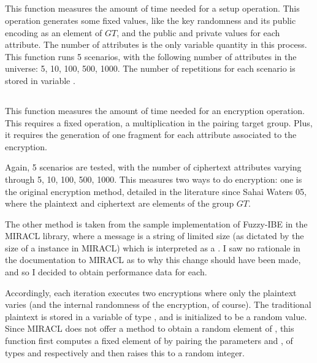 \documentclass{article}
\begin{document}
\subsection{}

This function measures the amount of time needed for a setup operation. This operation generates some fixed values, like the key randomness and its public encoding as an element of $GT$, and the public and private values for each attribute. The number of attributes is the only variable quantity in this process. This function runs 5 scenarios, with the following number of attributes in the universe: 5, 10, 100, 500, 1000.
The number of repetitions for each scenario is stored in variable .

\subsection{}

This function measures the amount of time needed for an encryption operation. This requires a fixed operation, a multiplication in the pairing target group. Plus, it requires the generation of one fragment for each attribute associated to the encryption. 

Again, 5 scenarios are tested, with the number of ciphertext attributes varying through 5, 10, 100, 500, 1000. This measures two ways to do encryption: one is the original encryption method, detailed in the literature since Sahai Waters 05, where the plaintext and ciphertext are elements of the group $GT$. 

The other method is taken from the sample implementation of Fuzzy-IBE in the MIRACL library, where a message is a string of limited size (as dictated by the size of a \cBig instance in MIRACL) which is interpreted as a \cBig. I saw no rationale in the documentation to MIRACL as to why this change should have been made, and so I decided to obtain performance data for each.

Accordingly, each iteration executes two encryptions where only the plaintext varies (and the internal randomness of the encryption, of course). The traditional plaintext is stored in a variable  of type , and is initialized to be a random value. Since MIRACL does not offer a method to obtain a random element of , this function first computes a fixed element of  by pairing the parameters  and , of types  and  respectively and then raises this to a random \cBig integer. 
\end{document}
